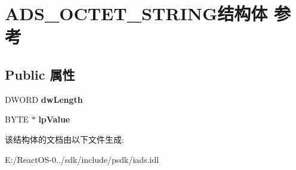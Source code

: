 \hypertarget{struct_a_d_s___o_c_t_e_t___s_t_r_i_n_g}{}\section{A\+D\+S\+\_\+\+O\+C\+T\+E\+T\+\_\+\+S\+T\+R\+I\+N\+G结构体 参考}
\label{struct_a_d_s___o_c_t_e_t___s_t_r_i_n_g}
\subsection*{Public 属性}
\begin{DoxyCompactItemize}
\item 
\mbox{\label{struct_a_d_s___o_c_t_e_t___s_t_r_i_n_g_aa07a9298fcb7e1562ea25abad96f59de}} 
D\+W\+O\+RD {\bfseries dw\+Length}
\item 
\mbox{\label{struct_a_d_s___o_c_t_e_t___s_t_r_i_n_g_a38b1727ac8ee75a0b8c04180a8453c07}} 
B\+Y\+TE $\ast$ {\bfseries lp\+Value}
\end{DoxyCompactItemize}


该结构体的文档由以下文件生成\+:\begin{DoxyCompactItemize}
\item 
E\+:/\+React\+O\+S-\/0../sdk/include/psdk/iads.\+idl\end{DoxyCompactItemize}
